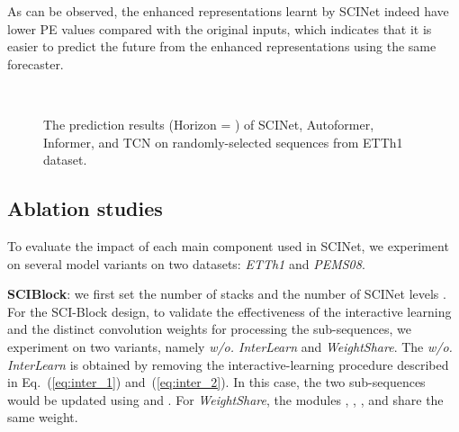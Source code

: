 \documentclass{article}
\begin{document}
As can be observed, the enhanced representations learnt by SCINet indeed have lower PE values compared with the original inputs, which indicates that it is easier to predict the future from the enhanced representations using the same forecaster. 









\begin{figure*}[h]	
	\\

\caption{The prediction results (Horizon = ) of SCINet, Autoformer, Informer, and TCN on randomly-selected sequences from ETTh1 dataset. } \vspace{5pt}
	\label{fig:compare}  \end{figure*}


\newpage
\subsection{Ablation studies}
\label{sec:ab}


To evaluate the impact of each main component used in SCINet, we experiment on several model variants on two datasets: \emph{ETTh1} and \emph{PEMS08}. \vspace{5pt}

\textbf{SCIBlock}: we first set the number of stacks  and the number of SCINet levels  . 
For the SCI-Block design, to validate the effectiveness of the interactive learning and the distinct convolution weights for processing the sub-sequences, we experiment on two variants, namely \emph{w/o. InterLearn} and \emph{WeightShare}. 
The \emph{w/o. InterLearn} is obtained by removing the interactive-learning procedure described in Eq.~(\ref{eq:inter_1}) and~(\ref{eq:inter_2}). In this case, the two sub-sequences would be updated using  and . 
For \emph{WeightShare}, the modules , , , and  share the same weight. 
\end{document}
